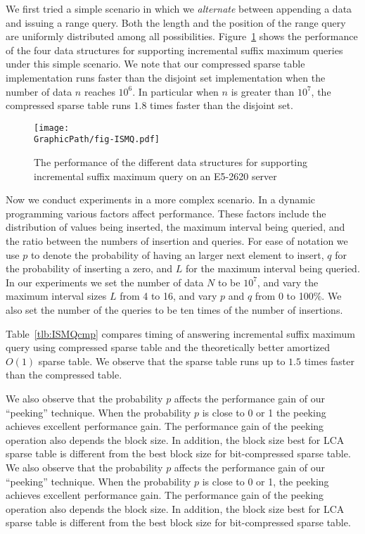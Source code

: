 We first tried a simple scenario in which we {\em alternate} between
appending a data and issuing a range query.  Both the length and the
position of the range query are uniformly distributed among all
possibilities.  Figure~\ref{fig:fig-ISMQcmp} shows the performance of
the four data structures for supporting incremental suffix maximum
queries under this simple scenario.  We note that our compressed sparse
table implementation runs faster than the disjoint set implementation
when the number of data $n$ reaches $10^6$.  In particular when $n$ is
greater than $10^7$, the compressed sparse table runs $1.8$ times faster
than the disjoint set.

\begin{figure}[!thb]
  \centering
  \texttt{[image: \\GraphicPath/fig-ISMQ.pdf]}
  \caption{The performance of the different data structures for
    supporting incremental suffix maximum query on an E5-2620 server}
  \label{fig:fig-ISMQcmp}
\end{figure}

Now we conduct experiments in a more complex scenario.  In a dynamic
programming various factors affect performance.  These factors include
the distribution of values being inserted, the maximum interval being
queried, and the ratio between the numbers of insertion and queries.
For ease of notation we use $p$ to denote the probability of having an
larger next element to insert, $q$ for the probability of inserting a
zero, and $L$ for the maximum interval being queried.  In our
experiments we set the number of data $N$ to be $10^7$, and vary the
maximum interval sizes $L$ from 4 to 16, and vary $p$ and $q$ from 0
to 100\%.  We also set the number of the queries to be ten times of
the number of insertions.

Table~\ref{tlb:ISMQcmp} compares timing of answering incremental
suffix maximum query using compressed sparse table and the
theoretically better amortized $O(1)$ sparse table.  We observe that
the sparse table runs up to $1.5$ times faster than the compressed
table.



We also observe that the probability $p$ affects the performance gain
of our ``peeking'' technique.  When the probability $p$ is close to 0
or 1 the peeking achieves excellent performance gain.  The performance
gain of the peeking operation also depends the block size.  In
addition, the block size best for LCA sparse table is different from
the best block size for bit-compressed sparse table.
We also observe that the probability $p$ affects the performance gain of
our ``peeking'' technique.  When the probability $p$ is close to 0 or 1,
the peeking achieves excellent performance gain.  The performance gain
of the peeking operation also depends the block size.  In addition, the
block size best for LCA sparse table is different from the best block
size for bit-compressed sparse table.

